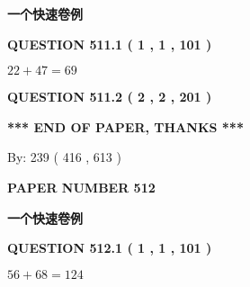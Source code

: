 \documentclass{ctexart}
\begin{document}
   
   
   
   
   
 \vspace{0.2in}
{\LARGE {\textbf{ 一个快速卷例}}}
   
   
  
\vspace{0.2in}
  
{\textbf{\Large{QUESTION
511.1 
 ( 1 , 1 , 101 )
}}}
  
  
 
 

$ %
22 +  %
47=   %
69$
 
 
  
\vspace{0.2in}
  
{\textbf{\Large{QUESTION
511.2 
 ( 2 , 2 , 201 )
}}}
  
  
   
   
 \vspace{0.2in}
 
   
   
   
   
\vspace{1.0in} 
{\textbf{\large{ *** END OF PAPER, THANKS *** }}} 
   
   
\hspace{1.0in} By: 
 239 ( 416 ,  613 )
   
   
   
   
\newpage 
\setcounter{page}{ 
   512001 } 
   
   
   
   
 {\textbf{ \Large{ PAPER NUMBER  512  }}}
   
   
\vspace{0.2in}
   
   
   
   
   
   
 \vspace{0.2in}
{\LARGE {\textbf{ 一个快速卷例}}}
   
   
  
\vspace{0.2in}
  
{\textbf{\Large{QUESTION
512.1 
 ( 1 , 1 , 101 )
}}}
  
  
 
 

$ %
56 +  %
68=   %
124$
 
\end{document}
